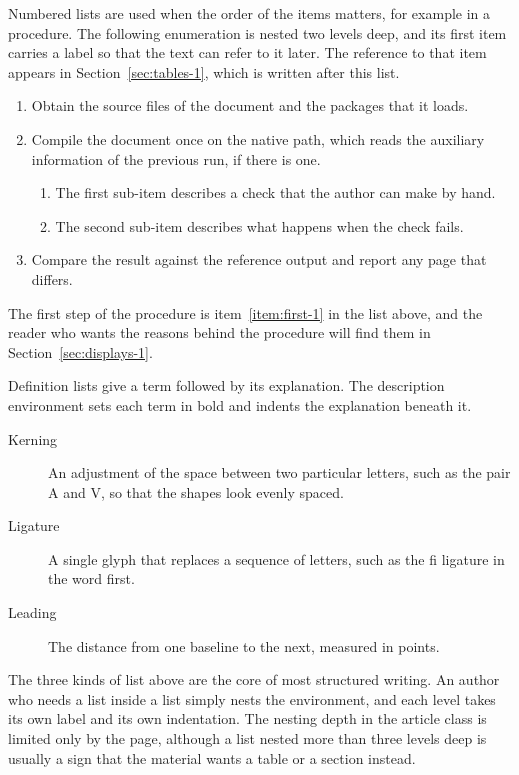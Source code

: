 \documentclass{article}
\begin{document}
Numbered lists are used when the order of the items matters, for example in a
procedure. The following enumeration is nested two levels deep, and its first item
carries a label so that the text can refer to it later. The reference to that item
appears in Section~\ref{sec:tables-1}, which is written after this list.

\begin{enumerate}
  \item\label{item:first-1} Obtain the source files of the document and the packages that
        it loads.
  \item Compile the document once on the native path, which reads the auxiliary
        information of the previous run, if there is one.
        \begin{enumerate}
          \item The first sub-item describes a check that the author can make by hand.
          \item The second sub-item describes what happens when the check fails.
        \end{enumerate}
  \item Compare the result against the reference output and report any page that
        differs.
\end{enumerate}

The first step of the procedure is item~\ref{item:first-1} in the list above, and the
reader who wants the reasons behind the procedure will find them in
Section~\ref{sec:displays-1}.

Definition lists give a term followed by its explanation. The description environment
sets each term in bold and indents the explanation beneath it.

\begin{description}
  \item[Kerning] An adjustment of the space between two particular letters, such as
        the pair A and V, so that the shapes look evenly spaced.
  \item[Ligature] A single glyph that replaces a sequence of letters, such as the
        fi ligature in the word first.
  \item[Leading] The distance from one baseline to the next, measured in points.
\end{description}

The three kinds of list above are the core of most structured writing. An author who
needs a list inside a list simply nests the environment, and each level takes its own
label and its own indentation. The nesting depth in the article class is limited only
by the page, although a list nested more than three levels deep is usually a sign that
the material wants a table or a section instead.
\end{document}
